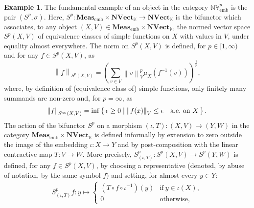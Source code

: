 \documentclass{amsart}
\theoremstyle{definition}
\newtheorem{example}[definition]{Example}
\theoremstyle{plain}
\newcommand{\norm}[1]{\left\lVert #1\right\rVert} %
\newcommand{\embMeas}{\mathbf{Meas}_\mathrm{emb}}
\newcommand{\NVect}{\mathbf{NVect}_{\mathbb{K}}}
\newcommand{\NVembp}{\mathbb{NV}_{\mathrm{emb}}^p}
\begin{document}
        \begin{example}
        \label{ex:simple functions with values in normed vector spaces 1}
            The fundamental example of an object in the category $\NVembp$ is the pair $(S^p,\sigma)$. 
            Here, $S^p \colon \embMeas \times \NVect \rightarrow \NVect$ is the bifunctor which associates, to any object $(X,V) \in \embMeas \times \NVect$, the normed vector space $S^p(X,V)$ of equivalence classes of simple functions on $X$ with values in $V$, under equality almost everywhere. 
            The norm on $S^p(X,V)$ is defined, for $p \in [1,\infty)$ and for any $f \in S^p(X,V)$, as
            \begin{equation}
            \label{eq:Lp norm for simple functions with values in normed vector spaces}
                \norm{f}_{S^p(X,V)} = \left( \sum_{v \in V} \norm{v}_V^p \mu_{X}\left( f^{-1}(v) \right) \right)^{\frac{1}{p}},
            \end{equation}
            where, by definition of (equivalence class of) simple functions, only finitely many summands are non-zero and, for $p = \infty$, as
            \begin{equation}
            \label{eq:Linfty norm for simple functions with values in normed vector spaces}
                \norm{f}_{S^\infty(X,V)} = \inf \Set{\epsilon \geq 0 | \norm{f(x)}_V \leq \epsilon \quad \text{a.e.~on} ~ X}.
            \end{equation}
            The action of the bifunctor $S^p$ on a morphism $(\iota,T) \colon (X,V) \rightarrow (Y,W)$ in the category $\embMeas \times \NVect$ is defined informally by extension to zero outside the image of the embedding $\iota \colon X \rightarrow Y$ and by post-composition with the linear contractive map $T \colon V \rightarrow W$. More precisely, $S^p_{(\iota,T)} \colon S^p(X,V) \rightarrow S^p(Y,W)$ is defined, for any $f \in S^p(X,V)$, by choosing a representative (denoted, by abuse of notation, by the same symbol $f$) and setting, for almost every $y \in Y$:
            \begin{equation}
            \label{eq:action of Sp on emb-morphisms}
                \begin{split}
                    S^p_{(\iota,T)}f \colon y \mapsto 
                        \begin{cases}
                            (T \circ f \circ \iota^{-1})(y) & \text{if} ~ y \in \iota(X), \\
                            0 & \text{otherwise,}
                        \end{cases}

\end{split}
\end{equation}
\end{example}
\end{document}
